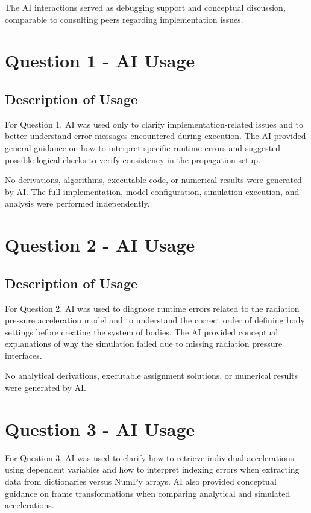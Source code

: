 \documentclass[a4paper,12pt]{article}
\begin{document}
The AI interactions served as debugging support and conceptual discussion, comparable to consulting peers regarding implementation issues.


\section*{Question 1 - AI Usage}

\subsection*{Description of Usage}
For Question 1, AI was used only to clarify implementation-related issues and to better understand error messages encountered during execution. The AI provided general guidance on how to interpret specific runtime errors and suggested possible logical checks to verify consistency in the propagation setup.

No derivations, algorithms, executable code, or numerical results were generated by AI. The full implementation, model configuration, simulation execution, and analysis were performed independently.

\section*{Question 2 - AI Usage}

\subsection*{Description of Usage}
For Question 2, AI was used to diagnose runtime errors related to the radiation pressure acceleration model and to understand the correct order of defining body settings before creating the system of bodies. The AI provided conceptual explanations of why the simulation failed due to missing radiation pressure interfaces.

No analytical derivations, executable assignment solutions, or numerical results were generated by AI.

\section*{Question 3 - AI Usage}

For Question 3, AI was used to clarify how to retrieve individual accelerations using dependent variables and how to interpret indexing errors when extracting data from dictionaries versus NumPy arrays. AI also provided conceptual guidance on frame transformations when comparing analytical and simulated accelerations.
\end{document}
